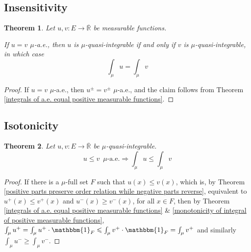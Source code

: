 \documentclass[11pt, a4paper, openany]{book}
\newtheorem{thm}{Theorem}\newtheorem{lem}{Lemma}\newtheorem{crl}{Corollary}
\theoremstyle{definition}
\newcommand{\er}{\overline{\mathbb{R}}}
\begin{document}
\subsection{Insensitivity}
    \begin{thm}\label{integral of almost everywhere equal measurable functions}
        Let $u,v:E\rightarrow \er$ be measurable functions. 
        
        If $u=v$ $\mu$-a.e., then $u$ is $\mu$-quasi-integrable if and only if $v$ is $\mu$-quasi-integrable, in which case
        \[
            \int_\mu u=\int_\mu v
        \]
    \end{thm}
    \begin{proof}
        If $u=v$ $\mu$-a.e., then $u^\pm=v^\pm$ $\mu$-a.e., and the claim follows from Theorem \ref{integrals of a.e. equal positive measurable functions}.
    \end{proof}
\subsection{Isotonicity}
    \begin{thm}\label{monotonicity of integral of quasi-integrable functions}
        Let $u,v:E\rightarrow \er$ be $\mu$-quasi-integrable.
        \[
            u\leqslant v\,\,\,\mu\text{-a.e.}\Longrightarrow \int_\mu u\leqslant \int_\mu v
        \]
    \end{thm}
    \begin{proof}
        If there is a $\mu$-full set $F$ such that $u(x)\leqslant v(x)$, which is, by Theorem \ref{positive parts preserve order relation while negative parts reverse}, equivalent to $u^+(x)\leqslant v^+(x)$ and $u^-(x)\geqslant v^-(x)$, for all $x\in F$, then by Theorem \ref{integrals of a.e. equal positive measurable functions} \& \ref{monotonicity of integral of positive measurable functions}, $\int_\mu u^+=\int_\mu u^+\cdot\mathbbm{1}_F\leqslant \int_\mu v^+\cdot\mathbbm{1}_F=\int_\mu v^+$ and similarly $\int_\mu u^-\geqslant \int_\mu v^-$.
    \end{proof}
\end{document}
